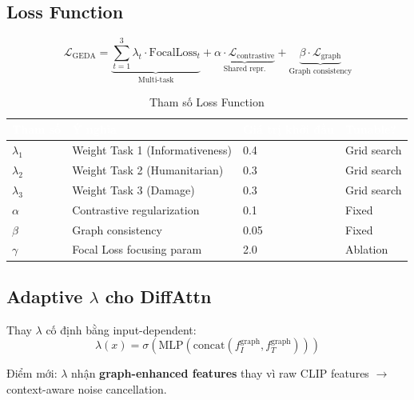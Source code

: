 \documentclass[12pt,a4paper]{article}
\begin{document}
\subsection{Loss Function}

\begin{equation}
\boxed{
\mathcal{L}_{\text{GEDA}} = \underbrace{\sum_{t=1}^{3} \lambda_t \cdot \text{FocalLoss}_t}_{\text{Multi-task}} + \underbrace{\alpha \cdot \mathcal{L}_{\text{contrastive}}}_{\text{Shared repr.}} + \underbrace{\beta \cdot \mathcal{L}_{\text{graph}}}_{\text{Graph consistency}}
}
\end{equation}

\begin{table}[H]
\centering
\caption{Tham số Loss Function}
\begin{tabular}{llll}
\toprule
\rowcolor{tableheader}
\textcolor{white}{\textbf{Tham số}} & \textcolor{white}{\textbf{Ý nghĩa}} & \textcolor{white}{\textbf{Giá trị khởi đầu}} & \textcolor{white}{\textbf{Tunable?}} \\
\midrule
$\lambda_1$ & Weight Task 1 (Informativeness) & 0.4 & Grid search \\
$\lambda_2$ & Weight Task 2 (Humanitarian) & 0.3 & Grid search \\
$\lambda_3$ & Weight Task 3 (Damage) & 0.3 & Grid search \\
$\alpha$ & Contrastive regularization & 0.1 & Fixed \\
$\beta$ & Graph consistency & 0.05 & Fixed \\
$\gamma$ & Focal Loss focusing param & 2.0 & Ablation \\
\bottomrule
\end{tabular}
\end{table}

\subsection{Adaptive $\lambda$ cho DiffAttn}

Thay $\lambda$ cố định bằng input-dependent:
\begin{equation}
\lambda(x) = \sigma\!\left(\text{MLP}\!\left(\text{concat}(f_I^{\text{graph}}, f_T^{\text{graph}})\right)\right)
\end{equation}

Điểm mới: $\lambda$ nhận \textbf{graph-enhanced features} thay vì raw CLIP features $\rightarrow$ context-aware noise cancellation.

\end{document}
